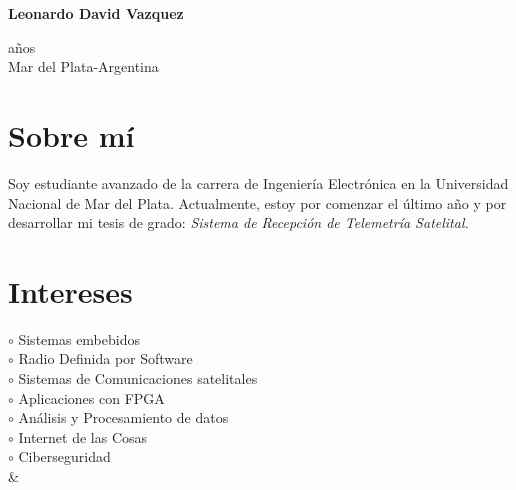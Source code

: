 \documentclass[a4paper,10pt]{article}
\begin{document}
\thispagestyle{empty}

\begin{adjustbox}{valign=t}
\begin{minipage}{0.34\textwidth} 
\begin{center}
\MySkip 	%
{\LARGE \bfseries Leonardo David Vazquez}
\MySkip 	%
\end{center}
 años\\
Mar del Plata-Argentina \MySkip
\raggedright
\textcolor{ColorRed}{\faEnvelopeO} 

\textcolor{ColorRed}{\faLinkedin} 

\textcolor{ColorRed}{\faGithub} 


\section*{Sobre mí}
\raggedright
Soy estudiante avanzado de la carrera de Ingeniería Electrónica en la Universidad Nacional de Mar del Plata. Actualmente, estoy por comenzar el último año y por desarrollar mi tesis de grado: {\it Sistema de Recepción de Telemetría Satelital.}
\section*{Intereses}
\raggedright
\textcolor{ColorOne}{$\circ$} Sistemas embebidos\\
\textcolor{ColorOne}{$\circ$} Radio Definida por Software\\
\textcolor{ColorOne}{$\circ$} Sistemas de Comunicaciones satelitales\\
\textcolor{ColorOne}{$\circ$} Aplicaciones con FPGA\\
\textcolor{ColorOne}{$\circ$} Análisis y Procesamiento de datos\\
\textcolor{ColorOne}{$\circ$} Internet de las Cosas\\
\textcolor{ColorOne}{$\circ$} Ciberseguridad\\
&\vfill

\end{minipage}
\end{adjustbox}
\end{document}
